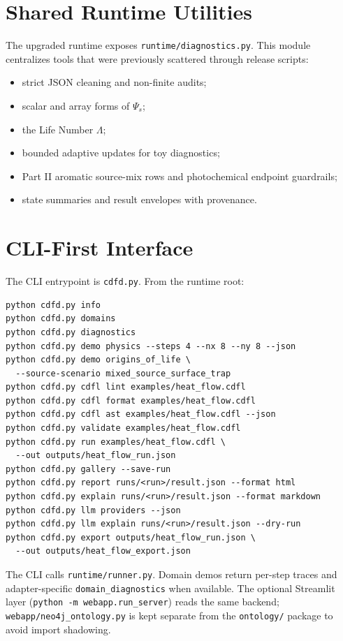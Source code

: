 \documentclass[12pt,a4paper]{article}
\begin{document}
\section{Shared Runtime Utilities}
The upgraded runtime exposes \texttt{runtime/diagnostics.py}. This module
centralizes tools that were previously scattered through release scripts:
\begin{itemize}
    \item strict JSON cleaning and non-finite audits;
    \item scalar and array forms of $\Psi_s$;
    \item the Life Number $\Lambda$;
    \item bounded adaptive updates for toy diagnostics;
    \item Part II aromatic source-mix rows and photochemical endpoint guardrails;
    \item state summaries and result envelopes with provenance.
\end{itemize}

\section{CLI-First Interface}
The CLI entrypoint is \texttt{cdfd.py}. From the runtime root:
\begin{verbatim}
python cdfd.py info
python cdfd.py domains
python cdfd.py diagnostics
python cdfd.py demo physics --steps 4 --nx 8 --ny 8 --json
python cdfd.py demo origins_of_life \
  --source-scenario mixed_source_surface_trap
python cdfd.py cdfl lint examples/heat_flow.cdfl
python cdfd.py cdfl format examples/heat_flow.cdfl
python cdfd.py cdfl ast examples/heat_flow.cdfl --json
python cdfd.py validate examples/heat_flow.cdfl
python cdfd.py run examples/heat_flow.cdfl \
  --out outputs/heat_flow_run.json
python cdfd.py gallery --save-run
python cdfd.py report runs/<run>/result.json --format html
python cdfd.py explain runs/<run>/result.json --format markdown
python cdfd.py llm providers --json
python cdfd.py llm explain runs/<run>/result.json --dry-run
python cdfd.py export outputs/heat_flow_run.json \
  --out outputs/heat_flow_export.json
\end{verbatim}

The CLI calls \texttt{runtime/runner.py}. Domain demos return per-step traces and
adapter-specific \texttt{domain\_diagnostics} when available. The optional
Streamlit layer (\texttt{python -m webapp.run\_server}) reads the same backend;
\texttt{webapp/neo4j\_ontology.py} is kept separate from the \texttt{ontology/}
package to avoid import shadowing.
\end{document}
